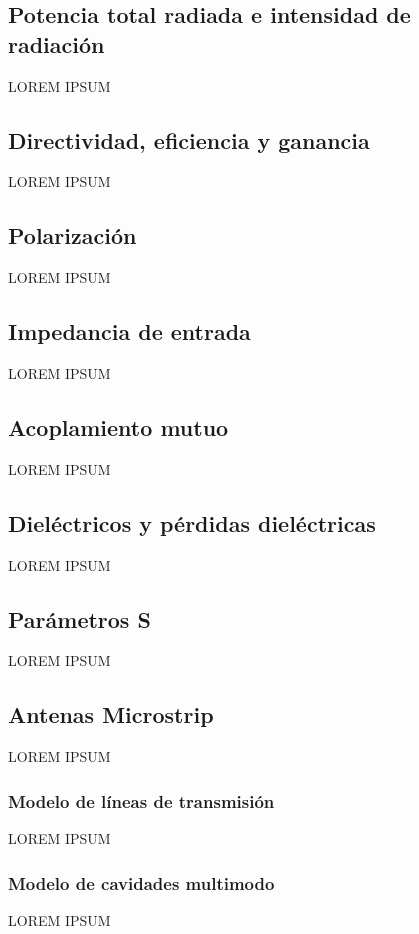 \subsection{Potencia total radiada e intensidad de radiación}
\label{subsubsec_pot_total_radiada}
LOREM IPSUM
\subsection{Directividad, eficiencia y ganancia}
\label{subsubsec_directividad}
LOREM IPSUM
\subsection{Polarización}
\label{subsubsec_polarizacion}
LOREM IPSUM

\subsection{Impedancia de entrada}
\label{subsec_imp_entrada}
LOREM IPSUM
\subsection{Acoplamiento mutuo}
\label{subsec_acoplamiento}
LOREM IPSUM
\subsection{Dieléctricos y pérdidas dieléctricas}
\label{subsec_dielectricos}
LOREM IPSUM
\subsection{Parámetros S}
\label{subsec_parametros_s}
LOREM IPSUM

\subsection{Antenas Microstrip}
\label{subsec_antenas_microstrip}
LOREM IPSUM
\subsubsection{Modelo de líneas de transmisión}
\label{subsubsec_microstrip_modeloLineas}
LOREM IPSUM
\subsubsection{Modelo de cavidades multimodo}
\label{subsubsec_microstrip_modeloCavidades}
LOREM IPSUM


